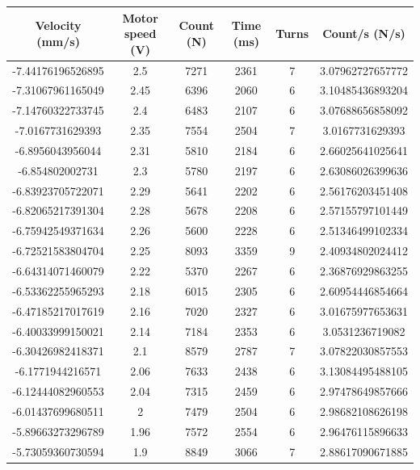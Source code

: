 \documentclass[a4paper]{report}
\numberwithin{equation}{section}
\begin{document}
\begin{table}[!ht]
    \centering
    \begin{tabular}{|c|c|c|c|c|c|}
    \hline
        Velocity (mm/s) & Motor speed (V) & Count (N) & Time (ms) & Turns & Count/s (N/s)\\ \hline
        -7.44176196526895 & 2.5 & 7271 & 2361 & 7 & 3.07962727657772 \\ \hline
        -7.31067961165049 & 2.45 & 6396 & 2060 & 6 & 3.10485436893204 \\ \hline
        -7.14760322733745 & 2.4 & 6483 & 2107 & 6 & 3.07688656858092 \\ \hline
        -7.0167731629393 & 2.35 & 7554 & 2504 & 7 & 3.0167731629393 \\ \hline
        -6.8956043956044 & 2.31 & 5810 & 2184 & 6 & 2.66025641025641 \\ \hline
        -6.854802002731 & 2.3 & 5780 & 2197 & 6 & 2.63086026399636 \\ \hline
        -6.83923705722071 & 2.29 & 5641 & 2202 & 6 & 2.56176203451408 \\ \hline
        -6.82065217391304 & 2.28 & 5678 & 2208 & 6 & 2.57155797101449 \\ \hline
        -6.75942549371634 & 2.26 & 5600 & 2228 & 6 & 2.51346499102334 \\ \hline
        -6.72521583804704 & 2.25 & 8093 & 3359 & 9 & 2.40934802024412 \\ \hline
        -6.64314071460079 & 2.22 & 5370 & 2267 & 6 & 2.36876929863255 \\ \hline
        -6.53362255965293 & 2.18 & 6015 & 2305 & 6 & 2.60954446854664 \\ \hline
        -6.47185217017619 & 2.16 & 7020 & 2327 & 6 & 3.01675977653631 \\ \hline
        -6.40033999150021 & 2.14 & 7184 & 2353 & 6 & 3.0531236719082 \\ \hline
        -6.30426982418371 & 2.1 & 8579 & 2787 & 7 & 3.07822030857553 \\ \hline
        -6.1771944216571 & 2.06 & 7633 & 2438 & 6 & 3.13084495488105 \\ \hline
        -6.12444082960553 & 2.04 & 7315 & 2459 & 6 & 2.97478649857666 \\ \hline
        -6.01437699680511 & 2 & 7479 & 2504 & 6 & 2.98682108626198 \\ \hline
        -5.89663273296789 & 1.96 & 7572 & 2554 & 6 & 2.96476115896633 \\ \hline
        -5.73059360730594 & 1.9 & 8849 & 3066 & 7 & 2.88617090671885 \\ \hline

\end{tabular}
\end{table}
\end{document}
